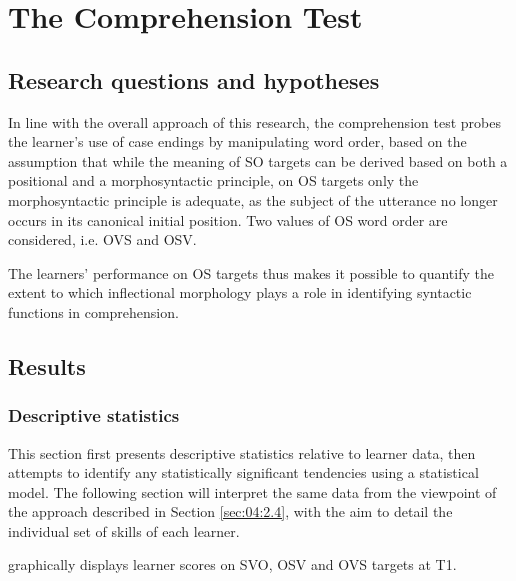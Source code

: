 \chapter{The Comprehension Test} 

\section{Research questions and hypotheses}\label{sec:05:1}

In line with the overall approach of this research, the comprehension test probes the learner's use of case endings by manipulating word order, based on the assumption that while the meaning of SO targets can be derived based on both a positional and a morphosyntactic principle, on OS targets only the morphosyntactic principle is adequate, as the subject of the utterance no longer occurs in its canonical initial position. Two values of OS word order are considered, i.e. OVS and OSV.

The learners’ performance on OS targets thus makes it possible to quantify the extent to which inflectional morphology plays a role in identifying syntactic functions in comprehension.

\section{Results}\label{sec:05:2}
\subsection{Descriptive statistics}\label{sec:05:2.1}

This section first presents descriptive statistics relative to learner data, then attempts to identify any statistically significant tendencies using a statistical model. The following section will interpret the same data from the viewpoint of the approach described in Section \ref{sec:04:2.4}, with the aim to detail the individual set of skills of each learner.

 graphically displays learner scores on SVO, OSV and OVS targets at T1.

